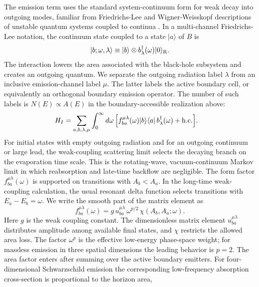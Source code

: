 \documentclass[12pt]{article}
\newcommand{\ket}[1]{|#1\rangle}
\newcommand{\bra}[1]{\langle #1|}
\begin{document}
The emission term uses the standard system-continuum form for weak decay into
outgoing modes, familiar from Friedrichs-Lee and Wigner-Weisskopf descriptions
of unstable quantum systems coupled to continua
\cite{Friedrichs1948,Lee1954,CohenTannoudji1992}.  In a multi-channel
Friedrichs-Lee notation, the continuum state coupled to a state $\ket a$ of
$B$ is
\begin{equation}
    \ket{b;\omega,\lambda}\equiv
    \ket b\otimes b_\lambda^\dagger(\omega)\ket{0}_{\rm R}.
\end{equation}
The interaction lowers the area associated with the black-hole subsystem and
creates an outgoing quantum.  We separate the outgoing radiation label
$\lambda$ from an inclusive emission-channel label $\mu$.  The latter
labels the active boundary cell, or equivalently an orthogonal boundary
emission operator.  The number of such labels is
$N(E)\propto A(E)$ in the boundary-accessible realization above:
\begin{align}
    H_I
    =
    \sum_{a,b,\lambda,\mu}
    \int_0^\infty d\omega\,
    \Big[
    &f^{\mu\lambda}_{ba}(\omega)
    \ket b\bra a\,
    b_\lambda^\dagger(\omega)
    +{\rm h.c.}\Big].
\end{align}
For initial states with empty outgoing radiation and for an outgoing continuum
or large lead, the weak-coupling scattering limit selects the decaying branch
on the evaporation time scale.  This is the rotating-wave, vacuum-continuum
Markov limit in which reabsorption and late-time backflow are negligible.
The form factor $f^{\mu\lambda}_{ba}(\omega)$ is supported on transitions with
$A_b<A_a$.  In the
long-time weak-coupling calculation, the usual resonant delta function selects
transitions with $E_a-E_b=\omega$.  We write the smooth part of the matrix
element as
\begin{equation}
    f^{\mu\lambda}_{ba}(\omega)
    =
    g\,u^{\mu\lambda}_{ba}\,
    \omega^{p/2}\,
    \chi(A_b,A_a;\omega).
\end{equation}
Here $g$ is the weak coupling constant.  The dimensionless matrix element
$u^{\mu\lambda}_{ba}$ distributes amplitude among available final states, and $\chi$
restricts the allowed area loss.  The factor
$\omega^p$ is the effective low-energy phase-space weight; for massless
emission in three spatial dimensions the leading behavior is $p=2$.  The
area factor enters after summing over the active boundary emitters.  For
four-dimensional Schwarzschild emission the corresponding low-frequency
absorption cross-section is proportional to the horizon area,
\end{document}
